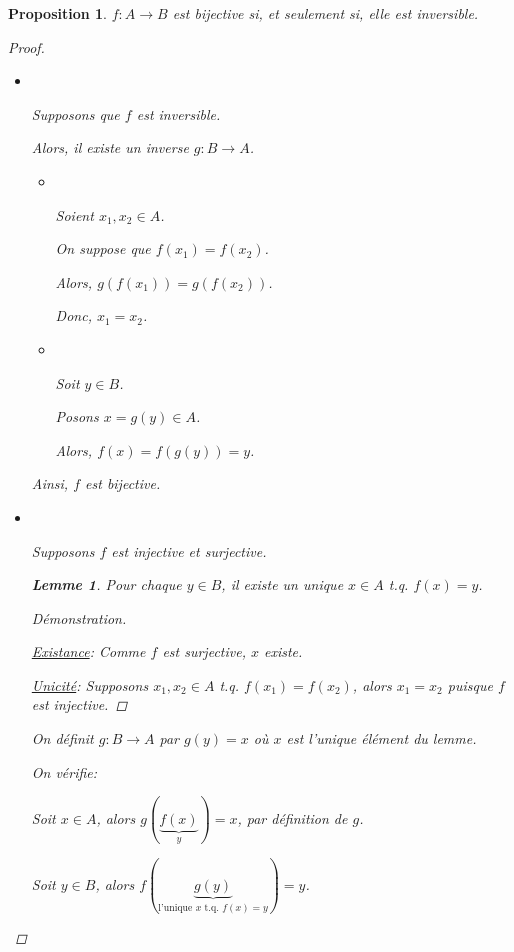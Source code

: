 \documentclass{report}
\newtheorem*{lem}{Lemme}
\newtheorem*{prop}{Proposition}
\theoremstyle{definition}
\theoremstyle{remark}
\newenvironment*{subproof}[1][D\'emonstration]
{
\begin{proof}[#1]

}
{
	\renewcommand{\qedsymbol}{$\blacksquare$}
\end{proof}
\renewcommand{\qedsymbol}{$\square$}
}
\begin{document}
	\begin{prop}
		$f:A \to B$ est bijective \emph{si, et seulement si,} elle est inversible.

		\begin{proof}~

			\begin{itemize}
				\item[$\Leftarrow$:] ~

				Supposons que $f$ est inversible.

				Alors, il existe un inverse $g:B \to A$.

				\begin{itemize}
					\item[(inj):] ~

					Soient $x_1,x_2 \in A$.

					On suppose que $f(x_1)=f(x_2)$.

					Alors, $g(f(x_1)) = g(f(x_2))$.

					Donc, $x_1 = x_2$.
					\item[(surj):] ~

					Soit $y \in B$.

					Posons $x=g(y) \in A$.

					Alors, $f(x)=f(g(y))=y$.
				\end{itemize}

				Ainsi, $f$ est bijective.
				\item[$\Rightarrow$:] ~

				Supposons $f$ est injective et surjective.

				\begin{lem}
					Pour \emph{chaque} $y \in B$, il existe un \emph{unique} $x \in A$ t.q. $f(x)=y$.

					\begin{subproof}~

						\underline{Existance}:
						Comme $f$ est surjective, $x$ existe.

						\underline{Unicit\'e}:
						Supposons $x_1,x_2 \in A$ t.q. $f(x_1)=f(x_2)$, alors $x_1=x_2$ puisque $f$ est injective.
					\end{subproof}
				\end{lem}

				On d\'efinit $g:B \to A$ par $g(y)=x$ o\`u $x$ est l'unique \'el\'ement du lemme.

				On v\'erifie:

				Soit $x \in A$, alors $g(\underbrace{f(x)}_y)=x$, par d\'efinition de $g$.

				Soit $y \in B$, alors $f(\underbrace{g(y)}_{\text{l'unique $x$ t.q. $f(x)=y$}})=y$.
			\end{itemize}
		\end{proof}
	\end{prop}
\end{document}
